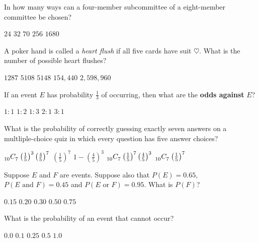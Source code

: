 \documentclass[answers,12pt]{exam}
\newcommand\ncr[2]{\tensor[_{#1}]C{_{#2}}}
\begin{document}
\begin{questions}
\question In how many ways can a four-member subcommittee
of a eight-member committee be chosen?\\
\begin{oneparchoices}
\choice $24$ %
\choice $32$ %
\correctchoice $70$
\choice $256$ %
\choice $1680$ %
\end{oneparchoices}

\question A poker hand is called a {\em heart flush}
if all five cards have suit $\heartsuit$. What is
the number of possible heart flushes?\\
\begin{oneparchoices}
\correctchoice $1287$
\choice $5108$ %
\choice $5148$ %
\choice $154,440$ %
\choice $2,598,960$ %
\end{oneparchoices}

\question If an event $E$ has probability $\frac{1}{3}$
of occurring, then what are the {\bf odds against} $E$?\\
\begin{oneparchoices}
\choice $1:1$
\choice $1:2$
\choice $1:3$
\correctchoice $2:1$
\choice $3:1$
\end{oneparchoices}

\question What is the probability of correctly guessing
exactly seven answers on a multliple-choice quiz
in which every question has five answer choices?\\
\begin{oneparchoices}
\choice $\textstyle\ncr{10}{7}\left(\frac{1}{5}\right)^3
\left(\frac{4}{5}\right)^7$
\choice $\textstyle\left(\frac{1}{5}\right)^7$
\choice $\textstyle 1-\left(\frac{4}{5}\right)^3$
\correctchoice $\textstyle\ncr{10}{7}\left(\frac{1}{5}\right)^7
\left(\frac{4}{5}\right)^3$
\choice $\textstyle\ncr{10}{7}\left(\frac{1}{5}\right)^7$
\end{oneparchoices}

\question Suppose $E$ and $F$ are events.
Suppose also that $P\left(E\right)=0.65$,
$P\left(\text{$E$ and $F$}\right)=0.45$
and $P\left(\text{$E$ or $F$}\right)=0.95$. What
is $P\left(F\right)$?\\
\begin{oneparchoices}
\choice $0.15$ %
\choice $0.20$ %
\choice $0.30$ %
\choice $0.50$ %
\correctchoice $0.75$
\end{oneparchoices}

\question What is the probability
of an event that cannot occur?\\
\begin{oneparchoices}
\correctchoice $0.0$
\choice $0.1$
\choice $0.25$
\choice $0.5$
\choice $1.0$
\end{oneparchoices}


\end{questions}
\end{document}
